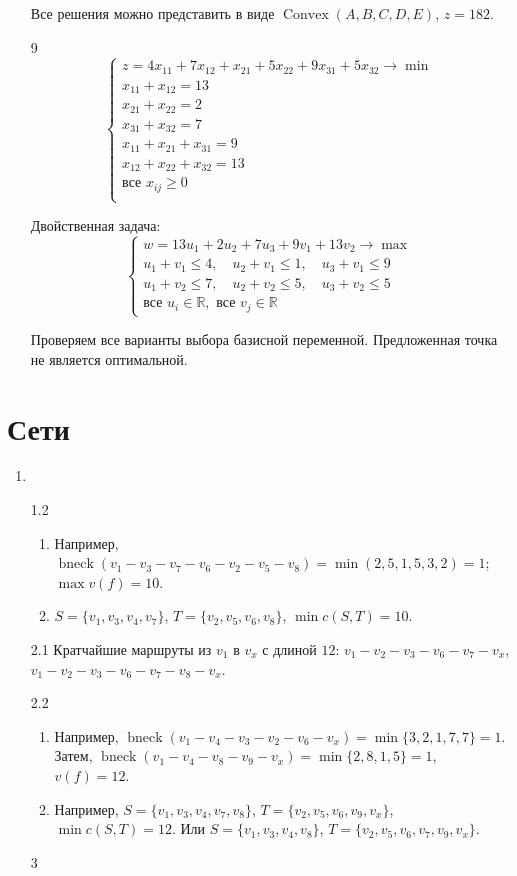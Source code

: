 \documentclass[12pt]{article}
\DeclareMathOperator{\bneck}{bneck}
\newcommand \RR{\mathbb{R}}
\DeclareMathOperator{\Convex}{Convex}
\begin{document}
\begin{enumerate}
 Все решения можно представить в виде $\Convex(A, B, C, D, E)$, $z = 182$.


\item[9]
\[
\begin{cases}
  z = 4x_{11} + 7 x_{12} + x_{21} + 5x_{22} + 9x_{31} + 5x_{32} \to \min \\
  x_{11} + x_{12} = 13 \\
  x_{21} + x_{22} = 2 \\
  x_{31} + x_{32} = 7 \\
  x_{11} + x_{21} + x_{31} = 9 \\
  x_{12} + x_{22} + x_{32} = 13 \\
  \text{все } x_{ij} \geq 0 \\
\end{cases}  
\]

Двойственная задача:
\[
\begin{cases}
  w = 13u_1 + 2u_2 + 7u_3 + 9v_1 + 13v_2 \to \max \\
  u_1 + v_1 \leq 4, \quad u_2 + v_1 \leq 1, \quad u_3 + v_1 \leq 9 \\
  u_1 + v_2 \leq 7, \quad u_2 + v_2 \leq 5, \quad u_3 + v_2 \leq 5 \\
  \text{все } u_i \in \RR, \text{ все } v_j \in \RR 
\end{cases}  
\]

Проверяем все варианты выбора базисной переменной. 
Предложенная точка не является оптимальной.

\end{enumerate}



\section*{Сети}

\begin{enumerate}
 \item
\item[1.2]
\begin{enumerate}
 \item Например, $\bneck(v_1 - v_3 - v_7 - v_6 - v_2 - v_5 - v_8) = \min(2, 5, 1, 5, 3, 2) = 1$; $\max v(f) = 10$.
 \item $S = \{ v_1, v_3, v_4, v_7\}$, $T = \{ v_2, v_5, v_6, v_8 \}$, $\min c(S, T) = 10$.
\end{enumerate}
\item[2.1] Кратчайшие маршруты из $v_1$ в $v_x$ с длиной $12$:
$v_1 - v_2 - v_3 - v_6 - v_7 - v_x$, $v_1 - v_2 - v_3 - v_6 - v_7 - v_8 - v_x$.
\item[2.2]
\begin{enumerate}
 \item Например, $\bneck(v_1 - v_4 - v_3 - v_2 - v_6 - v_x) = \min\{ 3, 2, 1, 7, 7\} = 1$.
Затем, $\bneck(v_1 - v_4 - v_8 - v_9 - v_x) = \min\{ 2, 8, 1, 5\} = 1$, $v(f) = 12$.
\item Например, $S = \{ v_1, v_3, v_4, v_7, v_8 \}$, $T = \{v_2, v_5, v_6, v_9, v_x \}$, $\min c(S, T) = 12$.
Или $S = \{ v_1, v_3, v_4, v_8 \}$, $T = \{v_2, v_5, v_6, v_7, v_9, v_x \}$.
\end{enumerate}
\item[3]

\end{enumerate}
\end{document}
